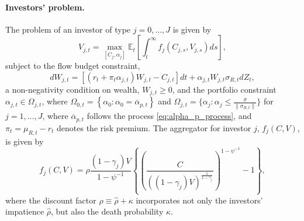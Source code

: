 \paragraph{Investors' problem.}  The problem of an investor of type $j = 0, \ldots, J$ is given by
\begin{equation}\label{eq:inv-problem}
    V_{j,t} = \max_{[C_j,\alpha_j]} \mathbb{E}_t\left[ \int_t^\infty f_j(C_{j,s},V_{j,s}) ds \right], 
\end{equation}
subject to the flow budget constraint, 
\begin{equation}
    d W_{j,t} = \left[ (r_t  + \pi_t \alpha_{j,t}) W_{j,t} - C_{j,t} \right] dt + \alpha_{j,t} W_{j,t} \sigma_{R,t} d Z_{t},
\end{equation}
a non-negativity condition on wealth, $W_{j,t} \geq 0$, and the portfolio constraint $\alpha_{j,t} \in \Omega_{j,t}$, where $\Omega_{0,t} = \left\lbrace\alpha_0: \alpha_0 = \overline{\alpha}_{p,t}\right\rbrace $ and $\Omega_{j,t} = \{\alpha_j: \alpha_j \leq \frac{\overline{\sigma}}{\|\sigma_{R,t}\|} \}$ for $j = 1,\ldots, J$, where $\overline{\alpha}_{p,t}$ follows the process \eqref{eq:alpha_p_process}, and $\pi_t = \mu_{R,t}-r_t$ denotes the risk premium. The aggregator for investor $j$, $f_j(C,V)$, is given by
\begin{equation}
    f_j(C,V) = \rho \frac{(1-\gamma_j) V}{1-\psi^{-1}} \left\{ \left( \frac{C}{\left( (1-\gamma_j) V \right)^{\frac{1}{1-\gamma_j}}} \right)^{1-\psi^{-1}} -1 \right\},
\end{equation}
where the discount factor $\rho \equiv \hat{\rho}+\kappa$ incorporates not only the investors' impatience $\hat{\rho}$, but also the death probability $\kappa$.

